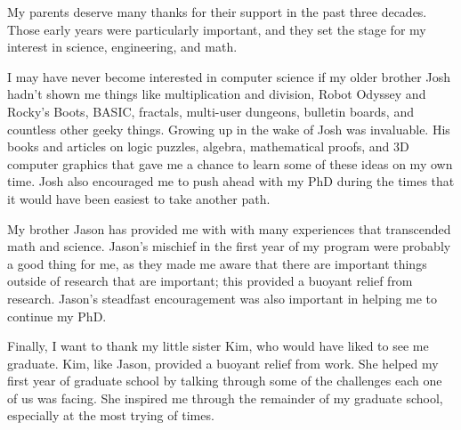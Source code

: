 My parents deserve many thanks for their support in the past three
decades.  Those early years were particularly important, and they set
the stage for my interest in science, engineering, and math.

I may have never become interested in computer science if my older
brother Josh hadn't shown me things like multiplication and division,
Robot Odyssey and Rocky's Boots, BASIC, fractals, multi-user dungeons,
bulletin boards, and countless other geeky things.  Growing up in the
wake of Josh was invaluable.  His books and articles on logic puzzles,
algebra, mathematical proofs, and 3D computer graphics that gave me a
chance to learn some of these ideas on my own time.  Josh also
encouraged me to push ahead with my PhD during the times that it would
have been easiest to take another path.

My brother Jason has provided me with with many experiences that
transcended math and science.  Jason's mischief in the first year of
my program were probably a good thing for me, as they made me aware
that there are important things outside of research that are
important; this provided a buoyant relief from research.  Jason's
steadfast encouragement was also important in helping me to continue
my PhD.

Finally, I want to thank my little sister Kim, who would have liked to
see me graduate.  Kim, like Jason, provided a buoyant relief from work.  She
helped my first year of graduate school by talking through some of the
challenges each one of us was facing.  She inspired me through the
remainder of my graduate school, especially at the most trying of
times.
